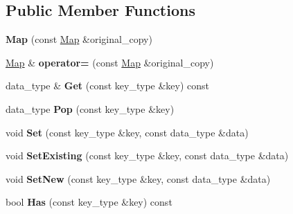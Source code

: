 \subsection*{Public Member Functions}
\begin{DoxyCompactItemize}
\item 
\hypertarget{class_data_structures_1_1_map_a5e7e6f886dc9dfe2e51f576bc492af9f}{{\bfseries Map} (const \hyperlink{class_data_structures_1_1_map}{Map} \&original\-\_\-copy)}\label{class_data_structures_1_1_map_a5e7e6f886dc9dfe2e51f576bc492af9f}

\item 
\hypertarget{class_data_structures_1_1_map_a8a100e16ebbae848f9ef51892bc41cdb}{\hyperlink{class_data_structures_1_1_map}{Map} \& {\bfseries operator=} (const \hyperlink{class_data_structures_1_1_map}{Map} \&original\-\_\-copy)}\label{class_data_structures_1_1_map_a8a100e16ebbae848f9ef51892bc41cdb}

\item 
\hypertarget{class_data_structures_1_1_map_a3514ebacc6a333e824d4fda7382275df}{data\-\_\-type \& {\bfseries Get} (const key\-\_\-type \&key) const }\label{class_data_structures_1_1_map_a3514ebacc6a333e824d4fda7382275df}

\item 
\hypertarget{class_data_structures_1_1_map_a59bf633e857535b30db9bc81531bd5c3}{data\-\_\-type {\bfseries Pop} (const key\-\_\-type \&key)}\label{class_data_structures_1_1_map_a59bf633e857535b30db9bc81531bd5c3}

\item 
\hypertarget{class_data_structures_1_1_map_a835a751752d457c333853bfecd30e9b0}{void {\bfseries Set} (const key\-\_\-type \&key, const data\-\_\-type \&data)}\label{class_data_structures_1_1_map_a835a751752d457c333853bfecd30e9b0}

\item 
\hypertarget{class_data_structures_1_1_map_ac1af66c855c322746bca61e7b9b26e8d}{void {\bfseries Set\-Existing} (const key\-\_\-type \&key, const data\-\_\-type \&data)}\label{class_data_structures_1_1_map_ac1af66c855c322746bca61e7b9b26e8d}

\item 
\hypertarget{class_data_structures_1_1_map_a101bf20cd6e9a46ed582618a48a1cfb4}{void {\bfseries Set\-New} (const key\-\_\-type \&key, const data\-\_\-type \&data)}\label{class_data_structures_1_1_map_a101bf20cd6e9a46ed582618a48a1cfb4}

\item 
\hypertarget{class_data_structures_1_1_map_ac4620bb554cace55c0f093abafad01d9}{bool {\bfseries Has} (const key\-\_\-type \&key) const }\label{class_data_structures_1_1_map_ac4620bb554cace55c0f093abafad01d9}


\end{DoxyCompactItemize}
